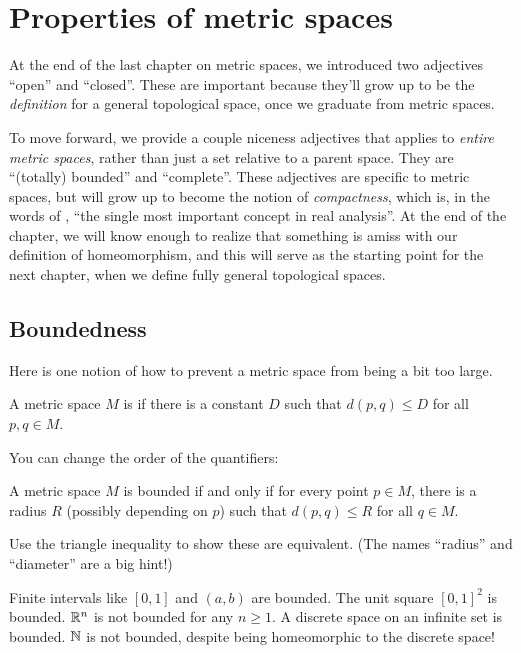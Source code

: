\chapter{Properties of metric spaces}
\label{ch:metric_properties}
At the end of the last chapter on metric spaces,
we introduced two adjectives ``open'' and ``closed''.
These are important because they'll grow up
to be the \emph{definition} for a general topological space,
once we graduate from metric spaces.

To move forward, we provide a couple niceness adjectives
that applies to \emph{entire metric spaces},
rather than just a set relative to a parent space.
They are ``(totally) bounded'' and ``complete''.
These adjectives are specific to metric spaces,
but will grow up to become the notion of \emph{compactness},
which is, in the words of \cite{ref:pugh},
``the single most important concept in real analysis''.
At the end of the chapter,
we will know enough to realize that something is amiss
with our definition of homeomorphism,
and this will serve as the starting point for the next chapter,
when we define fully general topological spaces.

\section{Boundedness}
Here is one notion of how to prevent a metric space
from being a bit too large.

\begin{definition}
	A metric space $M$ is 
	if there is a constant $D$ such that
	$d(p,q) \le D$ for all $p,q \in M$.
\end{definition}
You can change the order of the quantifiers:
\begin{proposition}
	A metric space $M$ is bounded if and only if
	for every point $p \in M$, there is a radius $R$
	(possibly depending on $p$) such that $d(p,q) \le R$ for all $q \in M$.
\end{proposition}
\begin{exercise}
	Use the triangle inequality to show these are equivalent.
	(The names ``radius'' and ``diameter'' are a big hint!)
\end{exercise}

\begin{example}
	\listhack
	\begin{enumerate}[(a)]
		\ii Finite intervals like $[0,1]$ and $(a,b)$ are bounded.
		\ii The unit square $[0,1]^2$ is bounded.
		\ii $\mathbb R^n$ is not bounded for any $n \ge 1$.
		\ii A discrete space on an infinite set is bounded.
		\ii $\mathbb N$ is not bounded, despite being
		homeomorphic to the discrete space!
	\end{enumerate}
\end{example}

